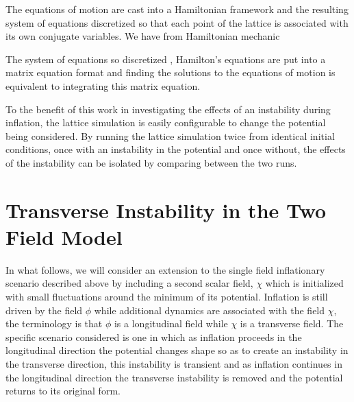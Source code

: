\documentclass[letterpaper,11pt]{article}
\begin{document}
The equations of motion are cast into a Hamiltonian framework and the resulting system of equations discretized so that each point of the lattice is associated with its own conjugate variables. We have from Hamiltonian mechanic

The system of equations so discretized , Hamilton's equations are put into a matrix equation format and finding the solutions to the equations of motion is equivalent to integrating this matrix equation.

To the benefit of this work in investigating the effects of an instability during inflation, the lattice simulation is easily configurable to change the potential being considered. By running the lattice simulation twice from identical initial conditions, once with an instability in the potential and once without, the effects of the instability can be isolated by comparing between the two runs.

\section{Transverse Instability in the Two Field Model}


In what follows, we will consider an extension to the single field inflationary scenario described above by including a second scalar field, $\chi$ which is initialized with small fluctuations around the minimum of its potential. Inflation is still driven by the field $\phi$ while additional dynamics are associated with the field $\chi$, the terminology is that $\phi$ is a longitudinal field while $\chi$ is a transverse field. The specific scenario considered is one in which as inflation proceeds in the longitudinal direction the potential changes shape so as to create an instability in the transverse direction, this instability is transient and as inflation continues in the longitudinal direction the transverse instability is removed and the potential returns to its original form.
\end{document}

